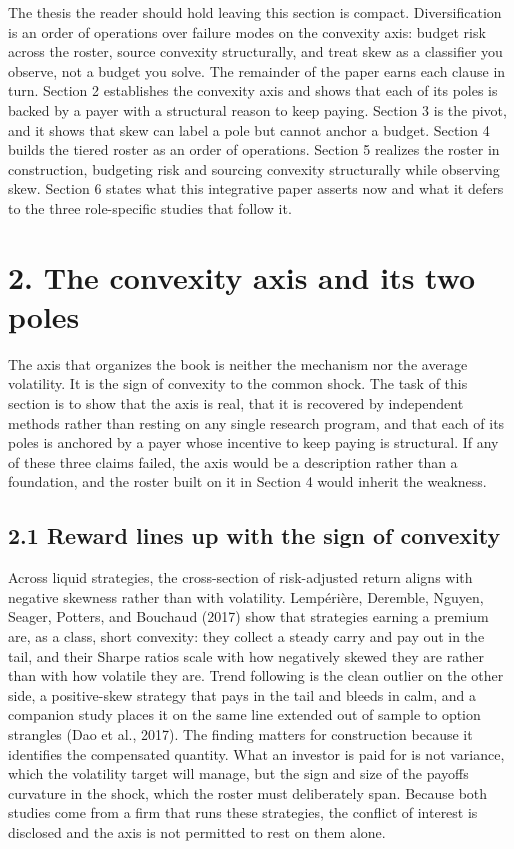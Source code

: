 \documentclass[12pt, a4paper]{article}
\begin{document}
The thesis the reader should hold leaving this section is compact.
Diversification is an order of operations over failure modes on the
convexity axis: budget risk across the roster, source convexity
structurally, and treat skew as a classifier you observe, not a budget
you solve. The remainder of the paper earns each clause in turn. Section
2 establishes the convexity axis and shows that each of its poles is
backed by a payer with a structural reason to keep paying. Section 3 is
the pivot, and it shows that skew can label a pole but cannot anchor a
budget. Section 4 builds the tiered roster as an order of operations.
Section 5 realizes the roster in construction, budgeting risk and
sourcing convexity structurally while observing skew. Section 6 states
what this integrative paper asserts now and what it defers to the three
role-specific studies that follow it.

\section*{2. The convexity axis and its two
poles}\label{the-convexity-axis-and-its-two-poles}

The axis that organizes the book is neither the mechanism nor the
average volatility. It is the sign of convexity to the common shock. The
task of this section is to show that the axis is real, that it is
recovered by independent methods rather than resting on any single
research program, and that each of its poles is anchored by a payer
whose incentive to keep paying is structural. If any of these three
claims failed, the axis would be a description rather than a foundation,
and the roster built on it in Section 4 would inherit the weakness.

\subsection*{2.1 Reward lines up with the sign of
convexity}\label{reward-lines-up-with-the-sign-of-convexity}

Across liquid strategies, the cross-section of risk-adjusted return
aligns with negative skewness rather than with volatility. Lempérière,
Deremble, Nguyen, Seager, Potters, and Bouchaud (2017) show that
strategies earning a premium are, as a class, short convexity: they
collect a steady carry and pay out in the tail, and their Sharpe ratios
scale with how negatively skewed they are rather than with how volatile
they are. Trend following is the clean outlier on the other side, a
positive-skew strategy that pays in the tail and bleeds in calm, and a
companion study places it on the same line extended out of sample to
option strangles (Dao et al., 2017). The finding matters for
construction because it identifies the compensated quantity. What an
investor is paid for is not variance, which the volatility target will
manage, but the sign and size of the payoff\textquotesingle s curvature
in the shock, which the roster must deliberately span. Because both
studies come from a firm that runs these strategies, the conflict of
interest is disclosed and the axis is not permitted to rest on them
alone.
\end{document}
